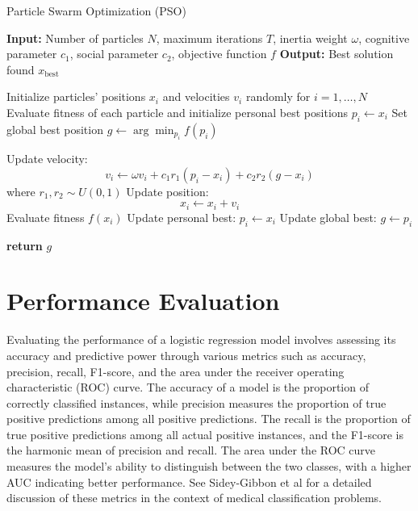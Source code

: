 \documentclass{article}[11pt]
\begin{document}
\begin{algorithm}[H]
\caption{Particle Swarm Optimization (PSO)}
\begin{algorithmic}[1]
\State \textbf{Input:} Number of particles $N$, maximum iterations $T$, inertia weight $\omega$, cognitive parameter $c_1$, social parameter $c_2$, objective function $f$
\State \textbf{Output:} Best solution found $x_\text{best}$

\State Initialize particles' positions $x_i$ and velocities $v_i$ randomly for $i = 1, \dots, N$
\State Evaluate fitness of each particle and initialize personal best positions $p_i \gets x_i$
\State Set global best position $g \gets \arg\min_{p_i} f(p_i)$

        \State Update velocity: 
        \[
        v_i \gets \omega v_i + c_1 r_1 (p_i - x_i) + c_2 r_2 (g - x_i)
        \]
        where $r_1, r_2 \sim U(0, 1)$
        \State Update position: 
        \[
        x_i \gets x_i + v_i
        \]
        \State Evaluate fitness $f(x_i)$
            \State Update personal best: $p_i \gets x_i$
        \EndIf
            \State Update global best: $g \gets p_i$
        \EndIf
    \EndFor
\EndFor

\State \textbf{return} $g$
\end{algorithmic}
\end{algorithm}


\section{Performance Evaluation}
Evaluating the performance of a logistic regression model involves assessing its accuracy and predictive power through various metrics such as accuracy, precision, recall, F1-score, and the area under the receiver operating characteristic (ROC) curve.
The accuracy of a model is the proportion of correctly classified instances, while precision measures the proportion of true positive predictions among all positive predictions. 
The recall is the proportion of true positive predictions among all actual positive instances, and the F1-score is the harmonic mean of precision and recall. 
The area under the ROC curve measures the model's ability to distinguish between the two classes, with a higher AUC indicating better performance.
See Sidey-Gibbon et al \cite{SG2019} for a detailed discussion of these metrics in the context of medical classification problems.
\end{document}
